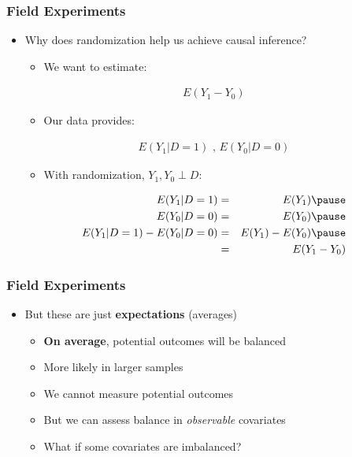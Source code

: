 \documentclass[xcolor=x11names,compress]{beamer}\usepackage[]{graphicx}\usepackage[]{color}
\renewcommand{\(}{\begin{columns}}
\renewcommand{\)}{\end{columns}}
\newcommand{\<}[1]{\begin{column}{#1}}
\renewcommand{\>}{\end{column}}
\begin{document}
\begin{frame}
\frametitle{Field Experiments}
\begin{itemize}
\item Why does randomization help us achieve causal inference?
\begin{itemize}
\item We want to estimate:
\end{itemize}
\begin{eqnarray}
E(Y_1 - Y_0)
\end{eqnarray}
\pause
\begin{itemize}
\item Our data provides:
\end{itemize}
\begin{eqnarray}
E(Y_1|D=1)\text{ ,  }E(Y_0|D=0)
\end{eqnarray}
\pause
\begin{itemize}
\item With randomization, $Y_1, Y_0 \perp D$:
\pause
\end{itemize}
\begin{eqnarray}
E(Y_1|D=1) &=& E(Y_1) \pause \\
E(Y_0|D=0) &=& E(Y_0) \pause \\
E(Y_1|D=1) - E(Y_0|D=0) &=& E(Y_1) - E(Y_0) \pause \\
&=& E(Y_1 - Y_0)
\end{eqnarray}
\end{itemize}
\end{frame}

\begin{frame}
\frametitle{Field Experiments}
\begin{itemize}
\item But these are just \textbf{expectations} (averages)
\pause
\begin{itemize}
\item \textbf{On average}, potential outcomes will be balanced
\pause
\item More likely in larger samples
\pause
\item We cannot measure potential outcomes
\pause
\item But we can assess balance in \textit{observable} covariates
\pause
\item What if some covariates are imbalanced? %
\end{itemize}
\end{itemize}
\end{frame}
\end{document}
